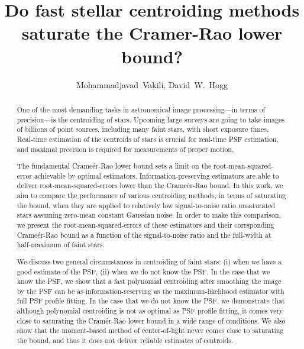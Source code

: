 \documentclass[12pt, preprint]{aastex}
\begin{document}
\author{
  Mohammadjavad~Vakili,
  David~W.~Hogg}

\title{Do fast stellar centroiding methods saturate the Cramer-Rao lower bound?}

\begin{abstract}
One of the most demanding tasks in astronomical image processing---in terms of precision---is 
the centroiding of stars. Upcoming large surveys are going to take images of 
billions of point sources, including many faint stars, with short exposure times. 
Real-time estimation of the centroids of stars is crucial for real-time PSF estimation, 
and maximal precision is required for measurements of proper motion. 

The fundamental Crame\'{e}r-Rao lower bound sets a limit on the root-mean-squared-error 
achievable by optimal estimators. Information-preserving estimators are able to deliver 
root-mean-squared-errors lower than the Crame\'{e}r-Rao bound. In this work, we aim to compare 
the performance of various centroiding methods, in terms of saturating the bound, when they 
are applied to relatively low signal-to-noise ratio unsaturated stars assuming zero-mean 
constant Gaussian noise. In order to make this comparison, we present the root-mean-squared-errors of 
these estimators and their corrsponding Crame\'{e}r-Rao bound as a function of the signal-to-noise ratio 
and the full-width at half-maximum of faint stars. 

We discuss two general circumstances in centroiding of faint stars: (i) when we have a good estimate
of the PSF, (ii) when we do not know the PSF. In the case that we know the PSF, 
we show that a fast polynomial centroiding after smoothing the image by the PSF can be 
as information-reserving as the maximum-likelihood estimator with full PSF profile fitting. 
In the case that we do not know the PSF, we demonstrate that although polynomial centroiding 
is not as optimal as PSF profile fitting, it comes very close to saturating the Cram\'{e}r-Rao lower bound
in a wide range of conditions. We also show that the moment-based method of center-of-light 
never comes close to saturating the bound, and thus it does not deliver reliable estimates of centroids.    
\end{abstract}
\end{document}
